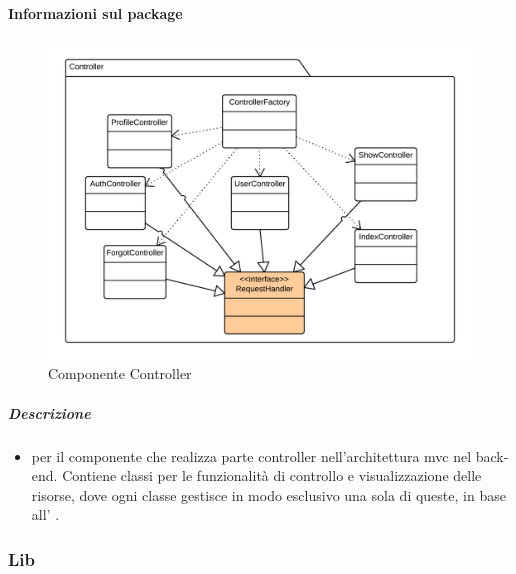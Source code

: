   \paragraph{Informazioni sul package} 
    \begin{figure}[H] 
      \begin{center} 
        \includegraphics[width=\textwidth]{packages/Back-end::Lib::Controller::Controller.png}  
        \caption{Componente Controller}
      \end{center}  
    \end{figure} 
  \subparagraph{Descrizione} 
    \begin{itemize}
    \item[]  per il componente che realizza parte controller nell’architettura mvc nel back-
end. Contiene classi per le funzionalità di controllo e visualizzazione delle risorse, dove ogni
classe gestisce in modo esclusivo una sola di queste, in base all’  .

    \end{itemize} 
  \subsubsection{Lib}
